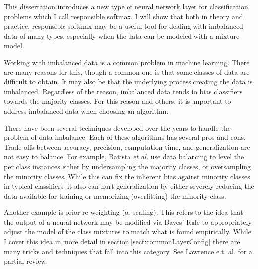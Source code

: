 
This dissertation introduces a new type of neural network layer for classification problems which I call responsible softmax.   I will show that both in theory and practice, responsible softmax may be a useful tool for dealing with imbalanced data of many types, especially when the data can be modeled with a mixture model.

Working with imbalanced data is a common problem in machine learning. There are many reasons for this, though a common one is that some classes of data are difficult to obtain. It may also be that the underlying process creating the data is imbalanced. Regardless of the reason, imbalanced data tends to bias classifiers towards the majority classes.  For this reason and others, it is important to address imbalanced data when choosing an algorithm.

There have been several techniques developed over the years to handle the problem of data imbalance. Each of these algorithms has several pros and cons. Trade offs between accuracy, precision, computation time, and generalization are not easy to balance. For example, Batista \textit{et al.} \cite{DataBalancing} use data balancing to level the per class instances either by undersampling the majority classes, or oversampling the minority classes.  While this can fix the inherent bias against minority classes in typical classifiers, it also can hurt generalization by either severely reducing the data available for training or memorizing (overfitting) the minority class. 

Another example is prior re-weighting (or scaling).  This refers to the idea that the output of a neural network may be modified via Bayes' Rule to appropriately adjust the model of the class mixtures to match what is found empirically.  While I cover this idea in more detail in section \ref{sect:commonLayerConfig} there are many tricks and techniques that fall into this category. See Lawrence e.t. al. \citep{Lawrence2012} for a partial review.

